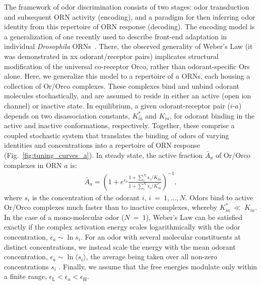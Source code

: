 The framework of odor discrimination consists of two stages: odor transduction and subsequent ORN activity (encoding), and a paradigm for then inferring odor identity from this repertoire of ORN response (decoding). The encoding model is a generalization of one recently used to describe front-end adaptation in individual \textit{Drosophila} ORNs~\cite{srinivas_elife}. There, the observed generality of Weber's Law (it was demonstrated in xx odorant/receptor pairs) implicates structural modification of the universal co-receptor Orco, rather than odorant-specific Ors alone. Here, we generalize this model to a repertoire of $a$ ORNs, each housing a collection of Or/Orco complexes. These complexes bind and unbind odorant molecules stochastically, and are assumed to reside in either an active (open ion channel) or inactive state. In equilibrium, a given odorant-receptor pair ($i$-$a$) depends on two disassociation constants, $K^*_{ia}$ and $K_{ia}$, for odorant binding in the active and inactive conformations, respectively. Together, these comprise a coupled stochastic system that translates the binding of odors of varying identities and concentrations into a repertoire of ORN response (Fig.~\ref{fig:tuning_curves_a}). In steady state, the active fraction $\bar A_a$ of Or/Orco complexes in ORN $a$ is:
\begin{align}
\bar{A}_a = \left(1 + e^{\epsilon_a}\frac{1 + \sum_i^N s_i/K_{ia}}{1 + \sum_i^N s_i/K^*_{ia}}\right)^{-1},
\label{eq:steady_state_act}
\end{align}
where $s_i$ is the concentration of the odorant $i$, $i~=~1,...,N$. Odors bind to active Or/Orco complexes much faster than to inactive complexes, whereby $K^*_{ia}~\ll~K_{ia}$. In the case of a mono-molecular odor ($N~=~1$), Weber's Law can be satisfied exactly if the complex activation energy scales logarithmically with the odor concentration, $\epsilon_a \sim \ln s_i$. For an odor with several molecular constituents at distinct concentrations, we instead scale the energy with the mean odorant concentration, $\epsilon_a \sim \ln \langle s_i \rangle$, the average being taken over all non-zero concentrations $s_i$ . Finally, we assume that the free energies modulate only within a finite range, $\epsilon_{\text {L}} < \epsilon_a < \epsilon_{\text {H}}$.








